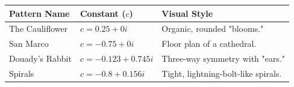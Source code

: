 \begin{table}[h]
    \centering
    \begin{tabular}{lll}
        \toprule
        \textbf{Pattern Name} & \textbf{Constant ($c$)} & \textbf{Visual Style} \\
        \midrule
        The Cauliflower & $c = 0.25 + 0i$ & Organic, rounded "blooms." \\
        San Marco       & $c = -0.75 + 0i$ & Floor plan of a cathedral. \\
        Douady's Rabbit & $c = -0.123 + 0.745i$ & Three-way symmetry with "ears." \\
        Spirals         & $c = -0.8 + 0.156i$ & Tight, lightning-bolt-like spirals. \\
        \bottomrule
    \end{tabular}
\end{table}